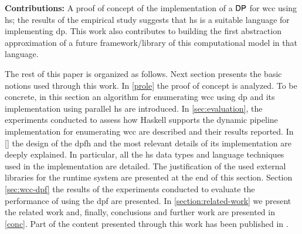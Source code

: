 \textbf{Contributions:} A proof of concept of the implementation of a $\mathsf{DP}$ for \acrshort{wcc} using \acrshort{hs}; the results of the empirical study suggests that   \acrshort{hs} is a suitable language for implementing \acrshort{dp}. This work also contributes to building the first abstraction approximation of a future framework/library of this computational model in that language. 

The rest of this paper is organized as follows.  Next section  presents  the basic notions used through this work. In \autoref{prole}  the proof of concept is analyzed. To be concrete, in this section an algorithm for enumerating \acrshort{wcc} using \acrshort{dp} and its implementation using parallel \acrshort{hs} are introduced. In \autoref{sec:evaluation}, the experiments conducted to assess how  Haskell supports the dynamic pipeline implementation for enumerating \acrshort{wcc} are described and their results reported. In  \autoref{} the design of the \acrlong{dpfh} and the most relevant details of its implementation are deeply explained. In particular, all the \acrshort{hs} data types and language techniques used in the implementation are detailed. The justification of the used  external libraries for the runtime system are presented at the end of this section. Section \ref{sec:wcc-dpf} the results of the experiments conducted to evaluate the performance of  using the \acrshort{dpf} are presented.  In \ref{section:related-work} we present the related work and, finally, conclusions and further work are presented in  \autoref{conc}. Part of the content presented through this work has been published in \cite{prole}. 
